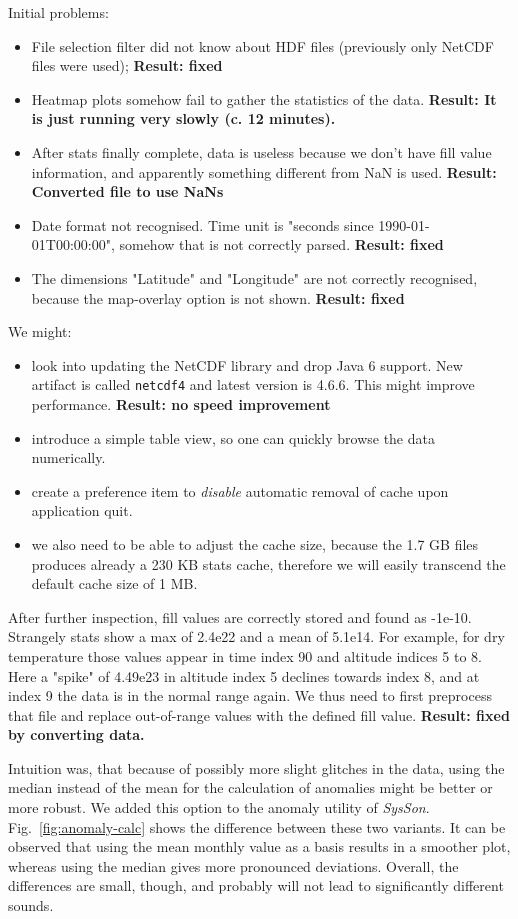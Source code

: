 \documentclass[11pt,a4paper]{article}
\newcommand{\figref}[1]{Fig.~\ref{#1}}
\newcommand{\software}[1]{\textit{#1}}
\begin{document}
Initial problems:
%
\begin{itemize}
\item File selection filter did not know about HDF files (previously only NetCDF files were used); \textbf{Result: fixed}
\item Heatmap plots somehow fail to gather the statistics of the data. \textbf{Result: It is just running very slowly (c. 12 minutes).}
\item After stats finally complete, data is useless because we don't have fill value information, and apparently something different from NaN is used. \textbf{Result: Converted file to use NaNs}
\item Date format not recognised. Time unit is "seconds since 1990-01-01T00:00:00", somehow that is not correctly parsed. \textbf{Result:  fixed}
\item The dimensions "Latitude" and "Longitude" are not correctly recognised, because the map-overlay option is not shown. \textbf{Result: fixed}
\end{itemize}
%
We might:
%
\begin{itemize}
\item look into updating the NetCDF library and drop Java 6 support. New artifact is called \Verb!netcdf4! and latest version is 4.6.6. This might improve performance. \textbf{Result: no speed improvement}
\item introduce a simple table view, so one can quickly browse the data numerically.
\item create a preference item to \emph{disable} automatic removal of cache upon application quit.
\item we also need to be able to adjust the cache size, because the 1.7 GB files produces already a 230 KB stats cache, therefore we will easily transcend the default cache size of 1 MB.
\end{itemize}
%
After further inspection, fill values are correctly stored and found as -1e-10. Strangely stats show a max of 2.4e22 and a mean of 5.1e14. For example, for dry temperature those values appear in time index 90 and altitude indices 5 to 8. Here a "spike" of 4.49e23 in altitude index 5 declines towards index 8, and at index 9 the data is in the normal range again. We thus need to first preprocess that file and replace out-of-range values with the defined fill value. \textbf{Result: fixed by converting data.}

Intuition was, that because of possibly more slight glitches in the data, using the median instead of the mean for the calculation of anomalies might be better or more robust. We added this option to the anomaly utility of \software{SysSon}. \figref{fig:anomaly-calc} shows the difference between these two variants. It can be observed that using the mean monthly value as a basis results in a smoother plot, whereas using the median gives more pronounced deviations. Overall, the differences are small, though, and probably will not lead to significantly different sounds.
\end{document}
